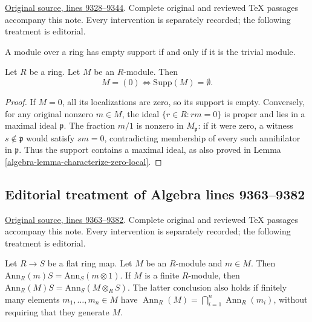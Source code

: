 \hypertarget{algebra-context-098}{}

\noindent\href{https://github.com/stacks/stacks-project/blob/a04446e57ec1fbc252a871afcec7752fb2807b14/algebra.tex\#L9328}{Original source, lines 9328--9344}. Complete original and reviewed TeX passages accompany this note. Every intervention is separately recorded; the following treatment is editorial.


\begin{lemma}
\label{editorial-source-lemma-support-zero}
\begin{slogan}
A module over a ring has empty support if and only if it is the trivial module.
\end{slogan}
Let $R$ be a ring. Let $M$ be an $R$-module. Then
$$
M = (0) \Leftrightarrow \text{Supp}(M) = \emptyset.
$$
\end{lemma}

\begin{proof}
If $M=0$, all its localizations are zero, so its support
is empty. Conversely, for any original nonzero $m\in M$,
the ideal $\{r\in R:rm=0\}$ is proper and lies in a
maximal ideal $\mathfrak p$. The fraction $m/1$ is nonzero
in $M_{\mathfrak p}$: if it were zero, a witness
$s\notin\mathfrak p$ would satisfy $sm=0$, contradicting
membership of every such annihilator in $\mathfrak p$.
Thus the support contains a maximal ideal, as also proved
in Lemma \ref{algebra-lemma-characterize-zero-local}.
\end{proof}


\subsection{Editorial treatment of Algebra lines 9363--9382}

\hypertarget{algebra-context-099}{}

\noindent\href{https://github.com/stacks/stacks-project/blob/a04446e57ec1fbc252a871afcec7752fb2807b14/algebra.tex\#L9363}{Original source, lines 9363--9382}. Complete original and reviewed TeX passages accompany this note. Every intervention is separately recorded; the following treatment is editorial.


\begin{lemma}
\label{editorial-source-lemma-annihilator-flat-base-change}
Let $R \to S$ be a flat ring map. Let $M$ be an $R$-module and
$m \in M$. Then $\text{Ann}_R(m) S = \text{Ann}_S(m \otimes 1)$.
If $M$ is a finite $R$-module, then
$\text{Ann}_R(M)S=\text{Ann}_S(M\otimes_R S)$.
The latter conclusion also holds if finitely many elements
$m_1,\ldots,m_n\in M$ have
$\operatorname{Ann}_R(M)=\bigcap_{i=1}^n\operatorname{Ann}_R(m_i)$,
without requiring that they generate $M$.
\end{lemma}

